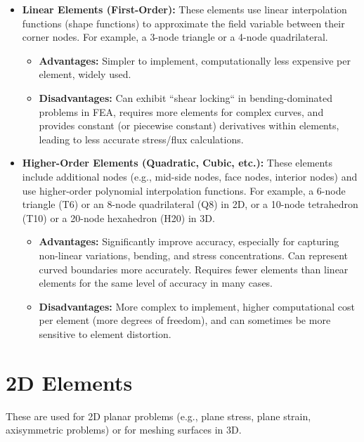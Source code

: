 \documentclass{book}
\begin{document}
\begin{itemize}[leftmargin=*,label=\textbullet]
\begin{itemize}[leftmargin=*,label=\textbullet]
    \item \textbf{Linear Elements (First-Order):} These elements use linear interpolation functions (shape functions) to approximate the field variable between their corner nodes. For example, a 3-node triangle or a 4-node quadrilateral.
    \begin{itemize}[leftmargin=*,label=$\circ$]
        \item \textbf{Advantages:} Simpler to implement, computationally less expensive per element, widely used.
        \item \textbf{Disadvantages:} Can exhibit ``shear locking`` in bending-dominated problems in FEA, requires more elements for complex curves, and provides constant (or piecewise constant) derivatives within elements, leading to less accurate stress/flux calculations.
    \end{itemize}
    \item \textbf{Higher-Order Elements (Quadratic, Cubic, etc.):} These elements include additional nodes (e.g., mid-side nodes, face nodes, interior nodes) and use higher-order polynomial interpolation functions. For example, a 6-node triangle (T6) or an 8-node quadrilateral (Q8) in 2D, or a 10-node tetrahedron (T10) or a 20-node hexahedron (H20) in 3D.
    \begin{itemize}[leftmargin=*,label=$\circ$]
        \item \textbf{Advantages:} Significantly improve accuracy, especially for capturing non-linear variations, bending, and stress concentrations. Can represent curved boundaries more accurately. Requires fewer elements than linear elements for the same level of accuracy in many cases.
        \item \textbf{Disadvantages:} More complex to implement, higher computational cost per element (more degrees of freedom), and can sometimes be more sensitive to element distortion.
    \end{itemize}
\end{itemize}

\section{2D Elements}
These are used for 2D planar problems (e.g., plane stress, plane strain, axisymmetric problems) or for meshing surfaces in 3D.


\end{itemize}
\end{document}
